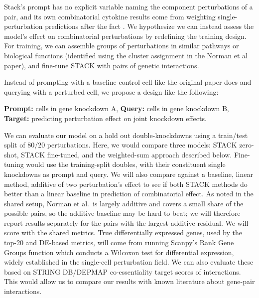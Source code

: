 \documentclass[times, twoside, watermark]{zHenriquesLab-StyleBioRxiv}
\begin{document}
Stack's prompt has no explicit variable naming the component perturbations of a pair, and its own combinatorial cytokine results come from weighting single-perturbation predictions after the fact \cite{dong2026stack}. We hypothesize we can instead assess the model’s effect on combinatorial perturbations by redefining the training design. For training, we can assemble groups of perturbations in similar pathways or biological functions (identified using the cluster assignment in the Norman et al paper), and fine-tune STACK with pairs of genetic interactions.

Instead of prompting with a baseline control cell like the original paper does and querying with a perturbed cell, we propose a design like the following: 

\textbf{Prompt:} cells in gene knockdown A, \textbf{Query:} cells in gene knockdown B, \textbf{Target:} predicting perturbation effect on joint knockdown effects. 

We can evaluate our model on a hold out double-knockdowns using a train/test split of 80/20 perturbations. Here, we would compare three models: STACK zero-shot, STACK fine-tuned, and the weighted-sum approach described below. Fine-tuning would use the training-split doubles, with their constituent single knockdowns as prompt and query. We will also compare against a baseline, linear method, additive of two perturbation's effect to see if both STACK methods do better than a linear baseline in prediction of combinatorial effect. As noted in the shared setup, Norman et al.\ is largely additive and covers a small share of the possible pairs, so the additive baseline may be hard to beat; we will therefore report results separately for the pairs with the largest additive residual. We will score with the shared metrics. True differentially expressed genes, used by the top-20 and DE-based metrics, will come from running Scanpy's \cite{Wolf2018} Rank Gene Groups function which conducts a Wilcoxon test for differential expression, widely established in the single-cell perturbation field. We can also evaluate these based on STRING DB/DEPMAP co-essentiality target scores of interactions. This would allow us to compare our results with known literature about gene-pair interactions.
\end{document}
